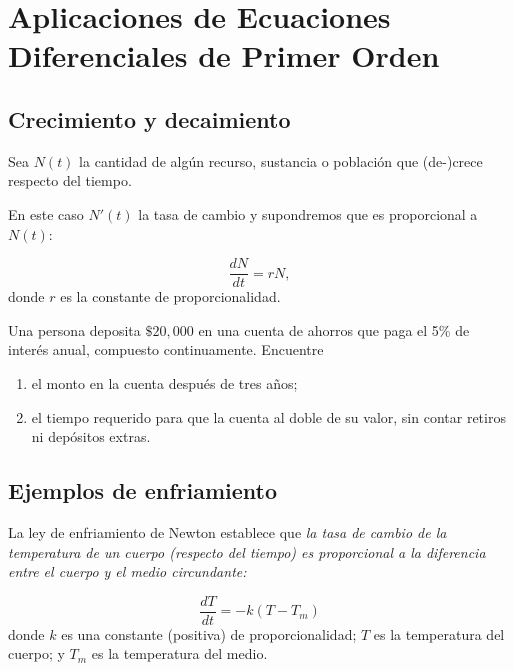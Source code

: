



\section[Aplicaciones]{Aplicaciones de Ecuaciones Diferenciales de Primer Orden}

\subsection{Crecimiento y decaimiento}


	Sea $N(t)$ la cantidad de algún recurso, sustancia o población que (de-)crece respecto del tiempo.
	
	En este caso $N'(t)$ la tasa de cambio y supondremos que es proporcional a $N(t):$
	
	\[
		\label{bron:7.1}
		\dfrac{dN}{dt}=rN,
	\]
	donde $r$ es la constante de proporcionalidad.



	\begin{problema}
		Una persona deposita $\$20,000$ en una cuenta de ahorros que paga el 5\% de interés  anual, compuesto continuamente.
		Encuentre
		\begin{enumerate}
			\item el monto en la cuenta después de tres años;  
			\item el tiempo requerido para que la cuenta al doble de su valor, sin contar retiros ni depósitos extras.
		\end{enumerate}
		
	\end{problema}
	


\subsection{Ejemplos de enfriamiento}


	La ley de enfriamiento de Newton establece que \emph{la tasa de cambio de la temperatura de un cuerpo (respecto del tiempo) es proporcional a la diferencia entre el cuerpo y el medio circundante:}
	
	\[
		\label{bron:7.2}
		\dfrac{dT}{dt}=-k\left( T-T_{m} \right)
	\]
	donde $k$ es una constante (positiva) de proporcionalidad; $T$ es la temperatura del cuerpo; y $T_{m}$ es la temperatura del medio.


